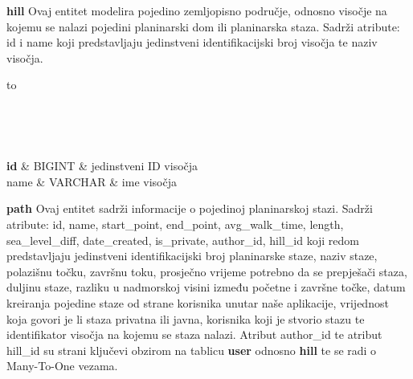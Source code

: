 				\textbf{hill} Ovaj entitet modelira pojedino zemljopisno područje, odnosno visočje na kojemu se nalazi pojedini planinarski dom ili planinarska staza. Sadrži atribute: id i name koji predstavljaju jedinstveni identifikacijski broj visočja te naziv visočja.
				
				\begin{longtabu} to \textwidth {|X[6, l]|X[6, l]|X[20, l]|}
					
					\hline {}	 \\[3pt] \hline
					\endfirsthead
					
					\hline {}	 \\[3pt] \hline
					\endhead
					
					\hline 
					\endlastfoot
					
					\textbf{id} & BIGINT	&  jedinstveni ID visočja 	\\ \hline
					name & VARCHAR	&  ime visočja 	\\ \hline
					
					
				\end{longtabu}
				\vspace{10mm}
			
			\textbf{path} Ovaj entitet sadrži informacije o pojedinoj planinarskoj stazi. Sadrži atribute: id, name, start\_point, end\_point, avg\_walk\_time, length, sea\_level\_diff, date\_created, is\_private, author\_id, hill\_id koji redom predstavljaju jedinstveni identifikacijski broj planinarske staze, naziv staze, polazišnu točku, završnu toku, prosječno vrijeme potrebno da se prepješači staza, duljinu staze, razliku u nadmorskoj visini između početne i završne točke, datum kreiranja pojedine staze od strane korisnika unutar naše aplikacije, vrijednost koja govori je li staza privatna ili javna, korisnika koji je stvorio stazu te identifikator visočja na kojemu se staza nalazi. Atribut author\_id te atribut hill\_id su strani ključevi obzirom na tablicu \textbf{user} odnosno \textbf{hill} te se radi o Many-To-One vezama.
			
